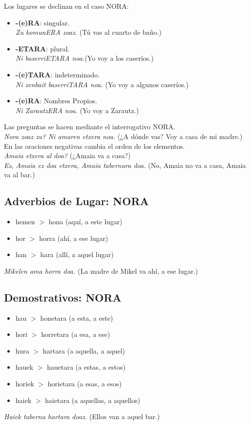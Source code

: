\documentclass[11pt, a4paper]{article}
\begin{document}
\noindent Los lugares se declinan en el caso NORA:
\begin{itemize}
\item \textbf{-(e)RA}: singular.\\
\indent \textit{Zu komunERA zoaz.} (Tú vas al cuarto de baño.)
\item \textbf{-ETARA}: plural.\\
\indent \textit{Ni baserriETARA noa.}(Yo voy a los caseríos.)
\item \textbf{-(e)TARA}: indeterminado.\\
\indent \textit{Ni zenbait baserriTARA noa.} (Yo voy a algunos caseríos.)
\item \textbf{-(e)RA}: Nombres Propios.\\ 
\indent \textit{Ni ZarautzERA noa.} (Yo voy a Zarautz.)
\end{itemize}

\noindent Las preguntas se hacen mediante el interrogativo NORA.\\
\indent \textit{Nora zoaz zu? Ni amaren etxera noa.} (¿A dónde vas? Voy a casa de mi madre.)\\

\noindent En las oraciones negativas cambia el orden de los elementos.\\
\indent \textit{Amaia etxera al doa?} (¿Amaia va a casa?)\\
\indent \textit{Ez, Amaia ez doa etxera, Amaia tabernara doa.} (No, Amaia no va a casa, Amaia va al bar.)

\subsection{Adverbios de Lugar: NORA}
\begin{itemize}
\item hemen $>$ hona (aquí, a este lugar)
\item hor $>$ horra (ahí, a ese lugar)
\item han $>$ hara (allí, a aquel lugar)
\end{itemize}
\indent \textit{Mikelen ama horra doa.} (La madre de Mikel va ahí, a ese lugar.)

\subsection{Demostrativos: NORA}
\begin{multicols}{2}
\begin{itemize}
\item hau $>$ honetara (a esta, a este)
\item hori $>$ horretara (a esa, a ese)
\item hura $>$ hartara (a aquella, a aquel)
\item hauek $>$ hauetara (a estas, a estos)
\item horiek $>$ horietara (a esas, a esos)
\item haiek $>$ haietara (a aquellas, a aquellos)
\end{itemize}
\end{multicols}
\indent \textit{Haiek taberna hartara doaz.} (Ellos van a aquel bar.)\\
\end{document}
